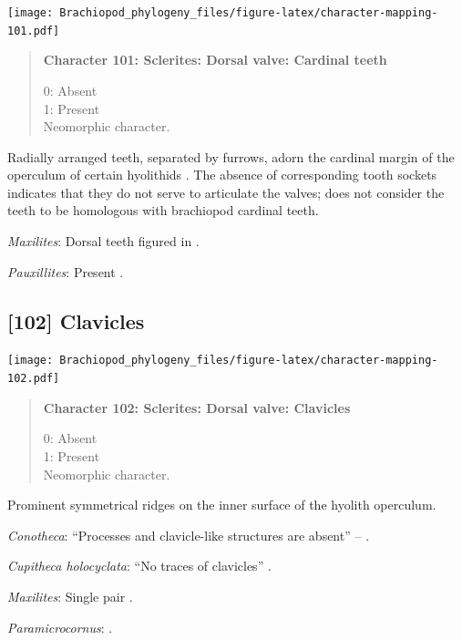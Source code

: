 \documentclass[openany]{book}
\begin{document}
\texttt{[image: Brachiopod\_phylogeny\_files/figure-latex/character-mapping-101.pdf]}

\begin{quote}
\textbf{Character 101: Sclerites: Dorsal valve: Cardinal teeth}

0: Absent\\
1: Present\\
Neomorphic character.
\end{quote}

Radially arranged teeth, separated by furrows, adorn the cardinal margin
of the operculum of certain hyolithids \citep{Marek1963}. The absence of
corresponding tooth sockets indicates that they do not serve to
articulate the valves; \citet{Marek1967} does not consider the teeth to
be homologous with brachiopod cardinal teeth.

\hypertarget{Maxilites-coding-101}{}
\emph{Maxilites}: Dorsal teeth figured in \citet{MartiMus2005}.

\hypertarget{Pauxillites-coding-101}{}
\emph{Pauxillites}: Present \citep{Marek1966}.

\subsection*{{[}102{]} Clavicles}\label{clavicles}

\texttt{[image: Brachiopod\_phylogeny\_files/figure-latex/character-mapping-102.pdf]}

\begin{quote}
\textbf{Character 102: Sclerites: Dorsal valve: Clavicles}

0: Absent\\
1: Present\\
Neomorphic character.
\end{quote}

Prominent symmetrical ridges on the inner surface of the hyolith
operculum.

\hypertarget{Conotheca-coding-102}{}
\emph{Conotheca}: ``Processes and clavicle-like structures are absent''
-- \citet{Devaere2014}.

\hypertarget{Cupitheca_holocyclata-coding-102}{}
\emph{Cupitheca holocyclata}: ``No traces of clavicles''
\citep{Skovsted2016}.

\hypertarget{Maxilites-coding-102}{}
\emph{Maxilites}: Single pair \citep{Marek1972}.

\hypertarget{Paramicrocornus-coding-102}{}
\emph{Paramicrocornus}: \citet{Zhang2018Ahyolithid}.
\end{document}
